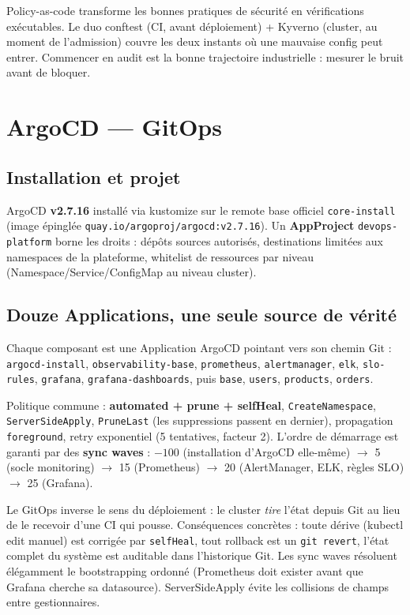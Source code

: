 \documentclass[11pt,a4paper]{article}
\begin{document}
\begin{whybox}
Policy-as-code transforme les bonnes pratiques de sécurité en vérifications exécutables. Le duo conftest (CI, avant déploiement) + Kyverno (cluster, au moment de l'admission) couvre les deux instants où une mauvaise config peut entrer. Commencer en audit est la bonne trajectoire industrielle : mesurer le bruit avant de bloquer.
\end{whybox}

\section{ArgoCD --- GitOps}

\subsection{Installation et projet}
ArgoCD \textbf{v2.7.16} installé via kustomize sur le remote base officiel \texttt{core-install} (image épinglée \texttt{quay.io/argoproj/argocd:v2.7.16}). Un \textbf{AppProject} \texttt{devops-platform} borne les droits : dépôts sources autorisés, destinations limitées aux namespaces de la plateforme, whitelist de ressources par niveau (Namespace/Service/ConfigMap au niveau cluster).

\subsection{Douze Applications, une seule source de vérité}
Chaque composant est une Application ArgoCD pointant vers son chemin Git : \texttt{argocd-install}, \texttt{observability-base}, \texttt{prometheus}, \texttt{alertmanager}, \texttt{elk}, \texttt{slo-rules}, \texttt{grafana}, \texttt{grafana-dashboards}, puis \texttt{base}, \texttt{users}, \texttt{products}, \texttt{orders}.

Politique commune : \textbf{automated + prune + selfHeal}, \texttt{CreateNamespace}, \texttt{ServerSideApply}, \texttt{PruneLast} (les suppressions passent en dernier), propagation \texttt{foreground}, retry exponentiel (5 tentatives, facteur 2). L'ordre de démarrage est garanti par des \textbf{sync waves} : $-100$ (installation d'ArgoCD elle-même) $\rightarrow$ 5 (socle monitoring) $\rightarrow$ 15 (Prometheus) $\rightarrow$ 20 (AlertManager, ELK, règles SLO) $\rightarrow$ 25 (Grafana).

\begin{whybox}
Le GitOps inverse le sens du déploiement : le cluster \emph{tire} l'état depuis Git au lieu de le recevoir d'une CI qui pousse. Conséquences concrètes : toute dérive (kubectl edit manuel) est corrigée par \texttt{selfHeal}, tout rollback est un \texttt{git revert}, l'état complet du système est auditable dans l'historique Git. Les sync waves résoluent élégamment le bootstrapping ordonné (Prometheus doit exister avant que Grafana cherche sa datasource). ServerSideApply évite les collisions de champs entre gestionnaires.
\end{whybox}
\end{document}
